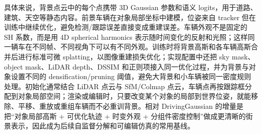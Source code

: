 具体来说，背景点云中的每个点携带 3D Gaussian 参数和语义 logits，用于道路、建筑、天空等静态内容。前景车辆在对象局部坐标中建模，位姿来自 tracker 但在训练中继续优化，避免检测/跟踪误差直接变成重建误差。车辆外观不是固定的 SH 系数，而是用 4D spherical harmonics 表示随时间变化的反射和光照；这样同一辆车在不同帧、不同视角下可以有不同外观。训练时将背景高斯和各车辆高斯合并后进行标准可微 splatting，以图像重建损失优化；实现配置中还把 sky mask、object mask、LiDAR depth、DSSIM 和正则项接入同一优化过程，并为背景与对象设置不同的 densification/pruning 阈值，避免大背景和小车辆被同一密度规则处理。初始化通常结合 LiDAR 点云与 SfM/Colmap 点云，车辆点再按跟踪框分配到对象局部空间；渲染或编辑时，只要改变某个对象的局部到世界位姿，就能移除、平移、重放或重组车辆而不必重训背景。相对 DrivingGaussian 的增量是把“对象局部高斯 + 可优化轨迹 + 时变外观 + 分组件密度控制”做成更清晰的街景表示，因此成为后续自监督分解和可编辑仿真的常用基线。

